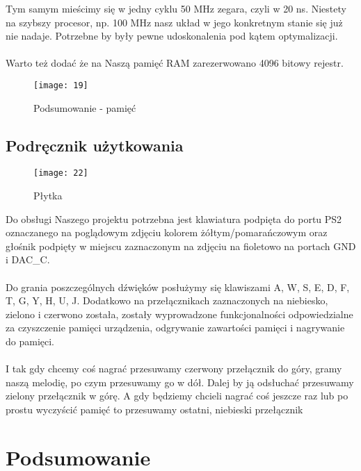 \documentclass[11pt]{article}
\begin{document}
	Tym samym mieścimy się w jedny cyklu 50 MHz zegara, czyli w 20 ns. Niestety na szybszy procesor, np. 100 MHz nasz układ w jego konkretnym stanie się już nie nadaje. Potrzebne by były pewne udoskonalenia pod kątem optymalizacji.\\\\Warto też dodać że na Naszą pamięć RAM zarezerwowano 4096 bitowy rejestr.
	
	\begin{figure}[H]
		\centering
		\centerline{\texttt{[image: 19]}}
		\caption{Podsumowanie - pamięć}
		\label{fig:11}
	\end{figure}
	
	\subsection{Podręcznik użytkowania}
	
	\begin{figure}[H]
		\centering
		\centerline{\texttt{[image: 22]}}
		\caption{Płytka}
		\label{fig:11}
	\end{figure}
	
	Do obsługi Naszego projektu potrzebna jest klawiatura podpięta do portu PS2 oznaczanego na poglądowym zdjęciu  kolorem żółtym/pomarańczowym oraz głośnik podpięty w miejscu zaznaczonym na zdjęciu na fioletowo na portach GND i DAC\_C.\\\\Do grania poszczególnych dźwięków posłużymy się klawiszami A, W, S, E, D, F, T, G, Y, H, U, J. Dodatkowo na przełącznikach zaznaczonych na niebiesko, zielono i czerwono została, zostały wyprowadzone funkcjonalności odpowiedzialne za czyszczenie pamięci urządzenia, odgrywanie zawartości pamięci i nagrywanie do pamięci.\\\\I tak gdy chcemy coś nagrać przesuwamy czerwony przełącznik do góry, gramy naszą melodię, po czym przesuwamy go w dół. Dalej by ją odsłuchać przesuwamy zielony przełącznik w górę. A gdy będziemy chcieli nagrać coś jeszcze raz lub po prostu wyczyścić pamięć to przesuwamy ostatni, niebieski przełącznik
	
	\section{Podsumowanie}
\end{document}

